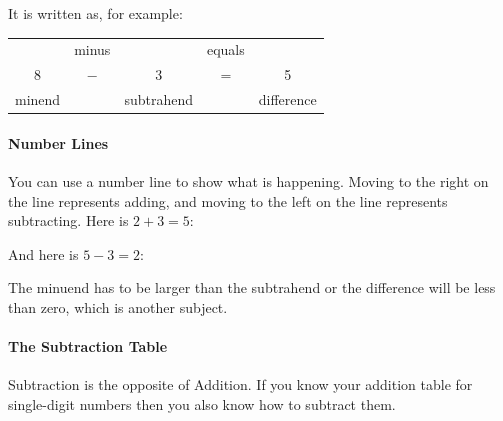\documentclass[12pt]{article}
\begin{document}
\begin{enumerate}
It is written as, for example:

\begin{table}[H]
    \centering
    \begin{tabular}{ccccc}
     \   & minus &   \    & equals &  \ \\
     \large{8}   &  \large{$-$}   &   \large{3}    &   \large{=}    &  \large{5} \\
  minend &  \   & subtrahend &   \    & difference
    \end{tabular}
\end{table}

\paragraph{Number Lines}
You can use a number line to show what is happening. Moving to the right on the line represents adding, and moving to the left on the line represents subtracting. Here is $2+3=5$:

\begin{center}
\end{center}

And here is $5-3=2$:

\begin{center}
\end{center}

The minuend has to be larger than the subtrahend or the difference will be less than zero, which is another subject.

\paragraph{The Subtraction Table}
Subtraction is the opposite of Addition. If you know your addition table for single-digit numbers then you also know how to subtract them.


\end{enumerate}
\end{document}
